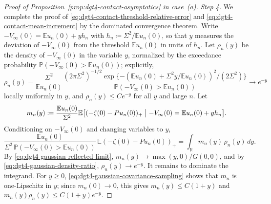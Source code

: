 \documentclass[11pt]{amsart}
\theoremstyle{plain}
\theoremstyle{definition}
\newcommand{\R}{\mathbb{R}}
\newcommand{\E}{\mathbb{E}}
\renewcommand{\P}{\mathbb{P}}
\begin{document}
\begin{proof}[Proof of Proposition~\ref{prop:dgt4-contact-asymptotics} in case~\textup{(a)}]
	\noindent\emph{Step 4.} We complete the proof of \eqref{eq:dgt4-contact-threshold-relative-error}
	and \eqref{eq:dgt4-contact-mean-increment} by the dominated convergence theorem. Write
	$-V_\infty(0)=\E u_n(0)+yh_n$ with $h_n\coloneqq\Sigma^2/\E u_n(0)$, so that $y$ measures
	the deviation of $-V_\infty(0)$ from the threshold $\E u_n(0)$ in units of $h_n$. Let
	$\rho_n(y)$ be the density of $-V_\infty(0)$ in the variable $y$, normalized by the
	exceedance probability $\P(-V_\infty(0)>\E u_n(0))$; explicitly,
	\begin{equation}\label{eq:dgt4-gaussian-density-ratio}
	\rho_n(y)=\frac{\Sigma^2}{\E u_n(0)}
	\frac{(2\pi\Sigma^2)^{-1/2}\exp\{-(\E u_n(0)+\Sigma^2y/\E u_n(0))^2/(2\Sigma^2)\}}{\P(-V_\infty(0)>\E u_n(0))}
	\longrightarrow e^{-y}
	\end{equation}
	locally uniformly in $y$, and $\rho_n(y)\leq Ce^{-y}$ for all $y$ and large $n$. Let
	\[
		m_n(y)\coloneqq\frac{\E u_n(0)}{\Sigma^2}\E\bigl[(-\zeta(0)-Pu_n(0))_+\bigm|-V_\infty(0)=\E u_n(0)+yh_n\bigr] .
	\]
	Conditioning on $-V_\infty(0)$ and changing variables to $y$,
	\begin{equation}\label{eq:dgt4-gaussian-integral-representation}
		\frac{\E u_n(0)}{\Sigma^2\,\P(-V_\infty(0)>\E u_n(0))}\,\E(-\zeta(0)-Pu_n(0))_+=\int_\R m_n(y)\,\rho_n(y)\,dy .
	\end{equation}
	By \eqref{eq:dgt4-gaussian-reflected-limit}, $m_n(y)\to\max(y,0)/G(0,0)$, and by
	\eqref{eq:dgt4-gaussian-density-ratio}, $\rho_n(y)\to e^{-y}$. It remains to dominate the
	integrand. For $y\geq0$, \eqref{eq:dgt4-gaussian-covariance-sampling} shows that $m_n$ is one-Lipschitz in $y$; since $m_n(0)\to0$, this gives $m_n(y)\leq C(1+y)$ and
	$m_n(y)\rho_n(y)\leq C(1+y)e^{-y}$.


\end{proof}
\end{document}
